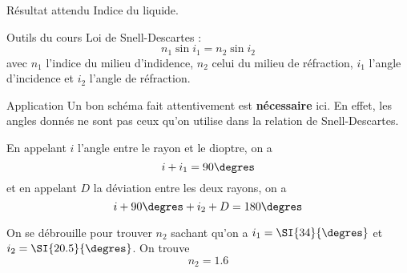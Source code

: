 \documentclass[../main/main.tex]{subfiles}
\begin{document}
\begin{NCprop}{Résultat attendu}
    Indice du liquide.
\end{NCprop}

\begin{NCdemo}{Outils du cours}
    Loi de Snell-Descartes :
    \[ n_1\sin i_1 = n_2 \sin i_2 \]
    avec $n_1$ l'indice du milieu d'indidence, $n_2$ celui du milieu de
    réfraction, $i_1$ l'angle d'incidence et $i_2$ l'angle de réfraction.
\end{NCdemo}

\begin{NCexem}{Application}
    Un bon schéma fait attentivement est \textbf{nécessaire} ici. En effet,
    les angles donnés ne sont pas ceux qu'on utilise dans la relation de
    Snell-Descartes. \bigbreak
    
    En appelant $i$ l'angle entre le rayon et le dioptre, on a
    \[ i + i_1 = 90\degres\]
    et en appelant $D$ la déviation entre les deux rayons, on a
    \[ i + 90\degres + i_2 + D = 180\degres\]

    On se débrouille pour trouver $n_2$ sachant qu'on a $i_1 = \SI{34}{\degres}$
    et $i_2 = \SI{20.5}{\degres}$. On trouve
    \[ \boxed{n_2 = 1.6} \]
\end{NCexem}
\end{document}
